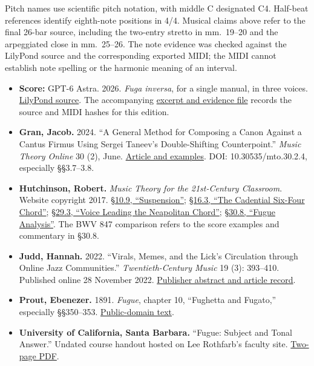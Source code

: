 \documentclass[11pt,a4paper]{article}
\providecommand{\tightlist}{\setlength{\itemsep}{0pt}\setlength{\parskip}{0pt}}
\begin{document}
Pitch names use scientific pitch notation, with middle C designated C4. Half-beat references identify eighth-note positions in 4/4. Musical claims above refer to the final 26-bar source, including the two-entry stretto in mm.~19--20 and the arpeggiated close in mm.~25--26. The note evidence was checked against the LilyPond source and the corresponding exported MIDI; the MIDI cannot establish note spelling or the harmonic meaning of an interval.

\begin{itemize}
\tightlist
\item
  \textbf{Score:} GPT-6 Astra. 2026. \emph{Fuga inversa}, for a single manual, in three voices. \href{https://chi-feng.github.io/fuga-inversa/assets/score/fugue.ly}{LilyPond source}. The accompanying \href{https://chi-feng.github.io/fuga-inversa/assets/evidence/excerpt-specifications.json}{excerpt and evidence file} records the source and MIDI hashes for this edition.
\item
  \textbf{Gran, Jacob.} 2024. ``A General Method for Composing a Canon Against a Cantus Firmus Using Sergei Taneev's Double-Shifting Counterpoint.'' \emph{Music Theory Online} 30 (2), June. \href{https://mtosmt.org/issues/mto.24.30.2/mto.24.30.2.gran.html}{Article and examples}. DOI: 10.30535/mto.30.2.4, especially §§3.7--3.8.
\item
  \textbf{Hutchinson, Robert.} \emph{Music Theory for the 21st-Century Classroom}. Website copyright 2017. \href{https://musictheory.pugetsound.edu/mt21c/Suspension.html}{§10.9, ``Suspension''}; \href{https://musictheory.pugetsound.edu/mt21c/TheCadentialSixFourChord.html}{§16.3, ``The Cadential Six-Four Chord''}; \href{https://musictheory.pugetsound.edu/mt21c/VoiceLeadingNeapolitanChord.html}{§29.3, ``Voice Leading the Neapolitan Chord''}; \href{https://musictheory.pugetsound.edu/mt21c/FugueAnalysis.html}{§30.8, ``Fugue Analysis''}. The BWV 847 comparison refers to the score examples and commentary in §30.8.
\item
  \textbf{Judd, Hannah.} 2022. ``Virals, Memes, and the Lick's Circulation through Online Jazz Communities.'' \emph{Twentieth-Century Music} 19 (3): 393--410. Published online 28 November 2022. \href{https://doi.org/10.1017/S1478572222000263}{Publisher abstract and article record}.
\item
  \textbf{Prout, Ebenezer.} 1891. \emph{Fugue}, chapter 10, ``Fughetta and Fugato,'' especially §§350--353. \href{https://en.wikisource.org/wiki/Fugue_(Prout)/Chapter_10}{Public-domain text}.
\item
  \textbf{University of California, Santa Barbara.} ``Fugue: Subject and Tonal Answer.'' Undated course handout hosted on Lee Rothfarb's faculty site. \href{https://rothfarb.faculty.music.ucsb.edu/courses/103/subject_answer.pdf}{Two-page PDF}.
\end{itemize}
\end{document}
